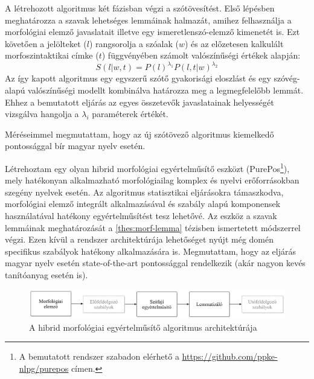 A létrehozott algoritmus két fázisban végzi a szótövesítést. 
Első lépésben meghatározza a szavak lehetséges lemmáinak halmazát, amihez felhasználja a morfológiai elemző javaslatait illetve egy ismeretlenszó-elemző kimenetét is. 
Ezt követően a jelölteket ($l$)  rangsorolja a szóalak ($w$) és az előzetesen kalkulált morfoszintaktikai címke ($t$) függvényében számolt valószínűségi értékek alapján:
\begin{equation}\label{lemma-interpolated}
S(l|w,t) = P(l)^{\lambda_1} P(l,t|w)^{\lambda_2}
\end{equation}
Az így kapott algoritmus egy egyszerű szótő gyakorisági eloszlást és egy szóvég-alapú valószínűségi modellt kombinálva határozza meg a legmegfelelőbb lemmát.
Ehhez a bemutatott eljárás az egyes összetevők javaslatainak helyességét vizsgálva hangolja a  $\lambda_i$ paraméterek értékét.

Méréseimmel megmutattam, hogy az új szótövező algoritmus kiemelkedő pontossággal bír magyar nyelv esetén. 

\thesisline%


\begin{core}
\begin{thesis}\label{thes:morf-tagging}
Létrehoztam egy olyan hibrid morfológiai egyértelműsítő eszközt (PurePos\footnote{A bemutatott rendszer szabadon elérhető a \href{https://github.com/ppke-nlpg/purepos}{https://github.com/ppke-nlpg/purepos} címen.}), mely hatékonyan alkalmazható  morfológiailag komplex és nyelvi erőforrásokban szegény nyelvek esetén. 
Az algoritmus statisztikai eljárásokra támaszkodva, morfológiai elemző integrált alkalmazásával és szabály alapú komponensek használatával hatékony egyértelműsítést tesz lehetővé. 
Az eszköz a szavak lemmáinak meghatározását a \ref{thes:morf-lemma} tézisben ismertetett módszerrel végzi.
Ezen kívül a rendszer architektúrája lehetőséget nyújt még domén specifikus szabályok hatékony alkalmazására is.
Megmutattam, hogy az eljárás magyar nyelv esetén state-of-the-art pontossággal rendelkezik (akár nagyon kevés tanítóanyag esetén is).
\end{thesis}

\begin{pub}
\cite{Orosz2011,Orosz2012,Orosz2012a,Orosz2013a}
\end{pub}
\end{core}

\begin{figure}[H] 
  \centering
  \includegraphics[width=1\textwidth]{MorphTagging/architecture_hu.png} 
  \caption{A hibrid morfológiai egyértelműsítő algoritmus architektúrája}
  \label{fig:purepos-arch_hu}
\end{figure}


